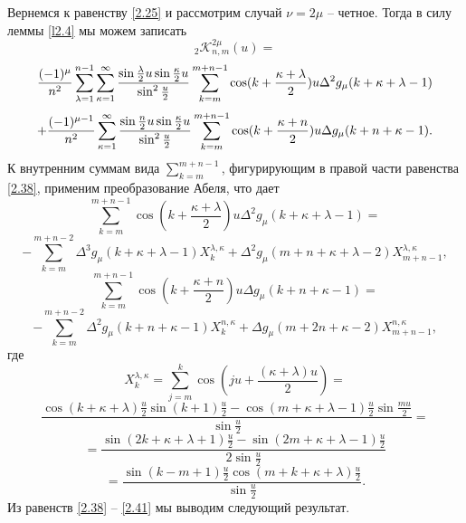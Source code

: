 Вернемся к равенству \eqref{2.25} и рассмотрим случай $\nu=2\mu$ -- четное.
Тогда в силу леммы \ref{l2.4} мы можем записать
$$
 _2\mathcal{ K}_{n,m}^{2\mu}(u)=
 $$
 $$
 {(-1)^\mu\over n^2}\sum\limits_{\lambda=1}^{n-1}
\sum\limits_{\kappa=1}^{\infty}\frac{\sin\frac{\lambda}{2}u\sin\frac{\kappa}{2}u}
{\sin^2\frac u2}
\sum_{k=m}^{m+n-1}\cos(k+\frac{\kappa+\lambda}{2})u\Delta^2g_\mu(k+\kappa+\lambda-1)
$$
 \begin{equation}\label{2.38}
    +{(-1)^{\mu-1}\over n^2}\sum\limits_{\kappa=1}^{\infty}
\frac{\sin\frac {n}{2}u\sin\frac{\kappa}{2}u}{\sin^2\frac u2}
\sum_{k=m}^{m+n-1}\cos(k+\frac{\kappa+n}{2})u\Delta g_\mu(k+n+\kappa-1).
 \end{equation}
 К внутренним суммам вида $\sum_{k=m}^{m+n-1}$, фигурирующим в правой части равенства \eqref{2.38}, применим преобразование Абеля, что дает
 $$
 \sum_{k=m}^{m+n-1}\cos(k+\frac{\kappa+\lambda}{2})u\Delta^2g_\mu(k+\kappa+\lambda-1)=
 $$
 \begin{equation}\label{2.39}
-\sum_{k=m}^{m+n-2}\Delta^3g_\mu(k+\kappa+\lambda-1)X_k^{\lambda,\kappa}
+\Delta^2g_\mu(m+n+\kappa+\lambda-2)X_{m+n-1}^{\lambda,\kappa},
\end{equation}
$$
\sum_{k=m}^{m+n-1}\cos(k+\frac{\kappa+n}{2})u\Delta g_\mu(k+n+\kappa-1)=
$$
 \begin{equation}\label{2.40}
-\sum_{k=m}^{m+n-2}\Delta^2g_\mu(k+n+\kappa-1)X_k^{n,\kappa}
+\Delta g_\mu(m+2n+\kappa-2)X_{m+n-1}^{n,\kappa},
    \end{equation}
где
$$
X_k^{\lambda,\kappa}=\sum_{j=m}^k \cos(ju+\frac{(\kappa+\lambda)u}{2})=
$$
$$
\frac{\cos(k+\kappa+\lambda)\frac{u}{2}\sin(k+1)\frac{u}{2}-
\cos(m+\kappa+\lambda-1)\frac{u}{2}\sin\frac{mu}{2}}{\sin\frac{u}{2}}=
$$
$$
=\frac{\sin(2k+\kappa+\lambda+1)\frac{u}{2}-\sin(2m+\kappa+\lambda-1)\frac{u}{2}}{2\sin\frac{u}{2}}
$$
 \begin{equation}\label{2.41}
=\frac{\sin(k-m+1)\frac{u}{2}\cos(m+k+\kappa+\lambda)\frac{u}{2}}{\sin\frac{u}{2}}.
    \end{equation}
Из равенств \eqref{2.38} -- \eqref{2.41} мы выводим следующий результат.

